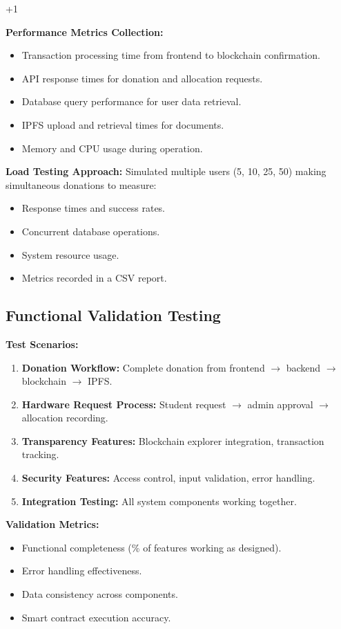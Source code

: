 +1\documentclass[conference]{IEEEtran}
\begin{document}
\textbf{Performance Metrics Collection:}
\begin{itemize}
    \item Transaction processing time from frontend to blockchain confirmation.
    \item API response times for donation and allocation requests.
    \item Database query performance for user data retrieval.
    \item IPFS upload and retrieval times for documents.
    \item Memory and CPU usage during operation.
\end{itemize}

\textbf{Load Testing Approach:}
Simulated multiple users (5, 10, 25, 50) making simultaneous donations to measure:
\begin{itemize}
    \item Response times and success rates.
    \item Concurrent database operations.
    \item System resource usage.
    \item Metrics recorded in a CSV report.
\end{itemize}

\subsection{Functional Validation Testing}
\textbf{Test Scenarios:}
\begin{enumerate}
    \item \textbf{Donation Workflow:} Complete donation from frontend \(\rightarrow\) backend \(\rightarrow\) blockchain \(\rightarrow\) IPFS.
    \item \textbf{Hardware Request Process:} Student request \(\rightarrow\) admin approval \(\rightarrow\) allocation recording.
    \item \textbf{Transparency Features:} Blockchain explorer integration, transaction tracking.
    \item \textbf{Security Features:} Access control, input validation, error handling.
    \item \textbf{Integration Testing:} All system components working together.
\end{enumerate}

\textbf{Validation Metrics:}
\begin{itemize}
    \item Functional completeness (\% of features working as designed).
    \item Error handling effectiveness.
    \item Data consistency across components.
    \item Smart contract execution accuracy.
\end{itemize}
\end{document}
